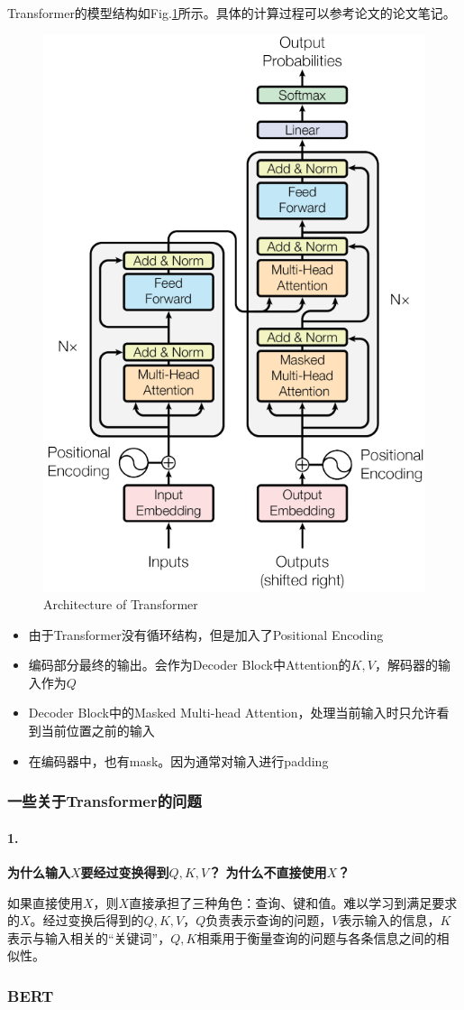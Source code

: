 Transformer的模型结构如Fig.\ref{fig:transformer}所示。具体的计算过程可以参考论文\cite{bivaswani2017attentionbid}的论文笔记。
\begin{figure}[h] 
	\centering
	\includegraphics[width=.4\textwidth]{pics/Transformer.png}
	\caption{Architecture of Transformer}
	\label{fig:transformer}
\end{figure}

\begin{itemize}
	\item 由于Transformer没有循环结构，但是加入了Positional Encoding
	\item 编码部分最终的输出。会作为Decoder Block中Attention的$K, V$，解码器的输入作为$Q$
	\item Decoder Block中的Masked Multi-head Attention，处理当前输入时只允许看到当前位置之前的输入
	\item 在编码器中，也有mask。因为通常对输入进行padding
\end{itemize}

\subsubsection{一些关于Transformer的问题}
\paragraph{1.}{\textbf{为什么输入$X$要经过变换得到$Q, K, V$？ 为什么不直接使用$X$？}}

如果直接使用$X$，则$X$直接承担了三种角色：查询、键和值。难以学习到满足要求的$X$。经过变换后得到的$Q, K, V$，$Q$负责表示查询的问题，$V$表示输入的信息，$K$表示与输入相关的“关键词”，$Q, K$相乘用于衡量查询的问题与各条信息之间的相似性。

\subsubsection{BERT}
